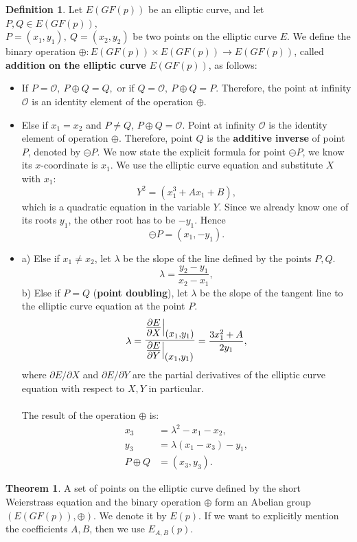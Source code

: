 \documentclass[thesis=M,english]{FITthesis}[2012/10/20]
\theoremstyle{remark}
\theoremstyle{definition}
\newtheorem{DF}{Definition}[section]
\newtheorem{theorem}{Theorem}[section]
\begin{document}
\begin{DF}
Let $E(GF(p))$ be an elliptic curve, and let $P,Q \in E(GF(p)),$\\${P=(x_1,y_1),\ Q=(x_2,y_2)}$ be two points on the elliptic curve $E$. We define the binary operation $\oplus: E(GF(p)) \times E(GF(p)) \to E(GF(p))$, called \textbf{addition on the elliptic curve} $E(GF(p))$, as follows:
\begin{itemize}
\item If $P = \mathcal{O},\ P \oplus Q = Q,$ or if $Q = \mathcal{O},\ P \oplus Q = P.$ Therefore, the point at infinity $\mathcal{O}$ is an identity element of the operation $\oplus$.
\item Else if $x_1 = x_2$ and $P\neq Q$, $P\oplus Q = \mathcal{O}.$ Point at infinity $\mathcal{O}$ is the identity element of operation $\oplus$. Therefore, point $Q$ is the \textbf{additive inverse} of point $P$, denoted by $\ominus P$. We now state the explicit formula for point $\ominus P$, we know its $x$-coordinate is $x_1$. We use the elliptic curve equation and substitute $X$ with $x_1$:
$$
Y^2  = (x_1^3 + Ax_1 + B),
$$
which is a quadratic equation in the variable $Y$. Since we already know one of its roots $y_1$, the other root has to be $-y_1$. Hence
$$\ominus P = (x_1, -y_1).$$
\item a) Else if $x_1 \neq x_2$, let $\lambda$ be the slope of the line defined by the points $P,Q.$
$$
\lambda = \frac{y_2 - y_1}{x_2 - x_1},
$$
b) Else if $P = Q$ (\textbf{point doubling}), let $\lambda$ be the slope of the tangent line to the elliptic curve equation at the point $P.$
$$
\lambda = \mathlarger{\mathlarger{\frac{\frac{\partial E}{\partial X}\big|_{(x_1,y_1)}}{\frac{\partial E}{\partial Y}\big|_{(x_1,y_1)}}}} = \frac{3x_1^2+ A}{2y_1}, 
$$
where $\partial E/\partial X$ and  $\partial E/\partial Y$ are the partial derivatives of the elliptic curve equation with respect to $X,Y$ in particular. \\ \\
\noindent The result of the operation $\oplus$ is:
\begin{align*}
x_3 &= \lambda^2 - x_1 - x_2, \\
y_3 &= \lambda(x_1 - x_3) - y_1, \\ 
 P \oplus Q &= (x_3, y_3).
\end{align*}
\end{itemize}
\end{DF}
\begin{theorem}
A set of points on the elliptic curve defined by the short Weierstrass equation and the binary operation $\oplus$ form an Abelian group $(E(GF(p)), \oplus)$. We denote it by $E(p)$. If we want to explicitly mention the coefficients $A,B$, then we use $E_{A,B}(p)$.
\end{theorem}
\end{document}
